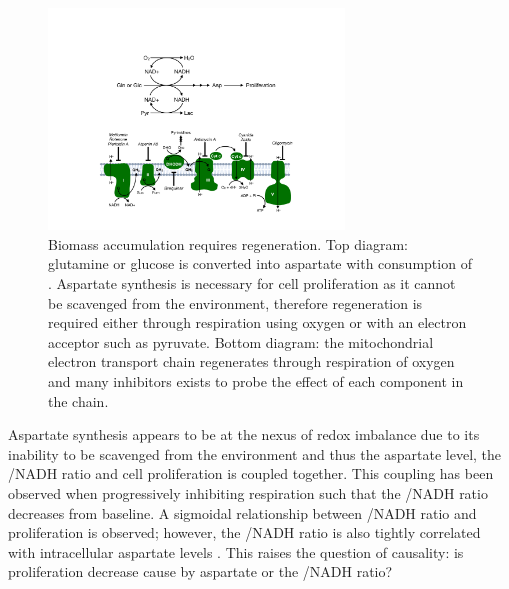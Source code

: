 \begin{figure}
    \centering
    \includegraphics[width=0.70\textwidth]{figures/chap1/redox_biomass.pdf}
    \caption[Biomass accumulation requires \NAD{} regeneration.]{
    Biomass accumulation requires \NAD{} regeneration.
    Top diagram: glutamine or glucose is converted into aspartate with consumption of \NAD.
    Aspartate synthesis is necessary for cell proliferation as it cannot be scavenged from the environment, therefore \NAD{} regeneration is required either through respiration using oxygen or with an electron acceptor such as pyruvate.
    Bottom diagram: the mitochondrial electron transport chain regenerates \NAD{} through respiration of oxygen and many inhibitors exists to probe the effect of each component in the chain.
    }
    \label{fig:ch1:redox_biomass}
\end{figure}


Aspartate synthesis appears to be at the nexus of redox imbalance due to its inability to be scavenged from the environment and thus the aspartate level, the \NAD/NADH ratio and cell proliferation is coupled together.
This coupling has been observed when progressively inhibiting respiration such that the \NAD/NADH ratio decreases from baseline.
A sigmoidal relationship between \NAD/NADH ratio and proliferation is observed; however, the \NAD/NADH ratio is also tightly correlated with intracellular aspartate levels \cite{Gui2016-ca}.
This raises the question of causality: is proliferation decrease cause by aspartate or the \NAD/NADH ratio?

